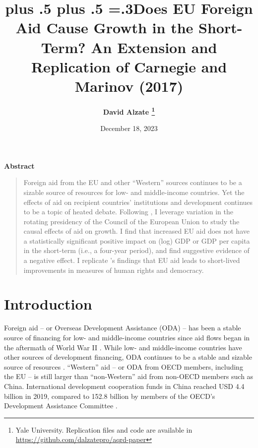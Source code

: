 \documentclass[12pt, ]{article}
\title{\sffamily\bfseries\huge\parfillskip=0pt
\rightskip=0pt plus .5\textwidth
\leftskip=0pt plus .5\textwidth
\emergencystretch=.3\textwidth Does EU Foreign Aid Cause Growth in the
Short-Term? An Extension and Replication of Carnegie and Marinov (2017)}
\author{\textbf{David Alzate \footnote{Yale University. Replication
  files and code are available in
  \url{https://github.com/dalzatepro/aqrd-paper}}}
 }
\date{December 18, 2023}
\renewenvironment{abstract}{
  \centerline
  {\large\sffamily\bfseries Abstract}\vspace{-1em}
  \begin{quote}\small
}{
  \end{quote}
}
\begin{document}
\allsectionsfont{\sffamily}

\maketitle

\begin{abstract}
Foreign aid from the EU and other ``Western'' sources continues to be a
sizable source of resources for low- and middle-income countries. Yet
the effects of aid on recipient countries' institutions and development
continues to be a topic of heated debate. Following
\citet{carnegie2017foreign}, I leverage variation in the rotating
presidency of the Council of the European Union to study the causal
effects of aid on growth. I find that increased EU aid does not have a
statistically significant positive impact on (log) GDP or GDP per capita
in the short-term (i.e., a four-year period), and find suggestive
evidence of a negative effect. I replicate \citet{carnegie2017foreign}'s
findings that EU aid leads to short-lived improvements in measures of
human rights and democracy.
\end{abstract}

\ifdefined\Shaded\renewenvironment{Shaded}{\begin{tcolorbox}[interior hidden, boxrule=0pt, borderline west={3pt}{0pt}{shadecolor}, enhanced, frame hidden, sharp corners, breakable]}{\end{tcolorbox}}\fi




\hypertarget{introduction}{%
\section{Introduction}\label{introduction}}

Foreign aid -- or Overseas Development Assistance (ODA) -- has been a
stable source of financing for low- and middle-income countries since
aid flows began in the aftermath of World War II \citep{ahmad2020six}.
While low- and middle-income countries have other sources of development
financing, ODA continues to be a stable and sizable source of resources
\citep{ahmad2020six}. ``Western'' aid -- or ODA from OECD members,
including the EU -- is still larger than ``non-Western'' aid from
non-OECD members such as China. International development cooperation
funds in China reached USD 4.4 billion in 2019, compared to 152.8
billion by members of the OECD's Development Assistance Committee
\citep{ahmad2020six}.
\end{document}
